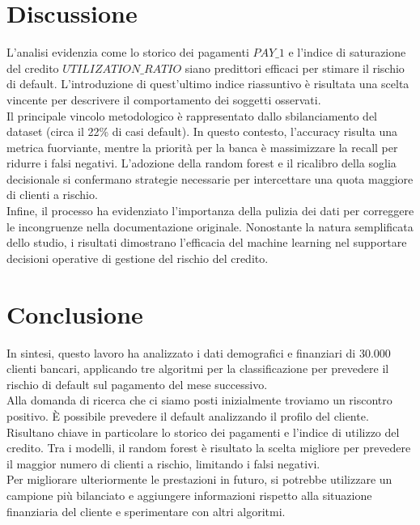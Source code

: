 \documentclass{article}
\begin{document}
\section{Discussione}
    L'analisi evidenzia come lo storico dei pagamenti $PAY\_1$ e l'indice di saturazione del credito $UTILIZATION\_RATIO$ siano predittori efficaci per stimare il rischio di default. L'introduzione di quest'ultimo indice riassuntivo \`e  risultata una scelta vincente per descrivere il comportamento dei soggetti osservati.\\
    Il principale vincolo metodologico \`e  rappresentato dallo sbilanciamento del dataset (circa il 22\% di casi default). In questo contesto, l'accuracy risulta una metrica fuorviante, mentre la priorit\`a per la banca \`e  massimizzare la recall per ridurre i falsi negativi. L'adozione della random forest e il ricalibro della soglia decisionale si confermano strategie necessarie per intercettare una quota maggiore di clienti a rischio.\\
    Infine, il processo ha evidenziato l'importanza della pulizia dei dati per correggere le incongruenze nella documentazione originale. Nonostante la natura semplificata dello studio, i risultati dimostrano l'efficacia del machine learning nel supportare decisioni operative di gestione del rischio del credito. 

\section{Conclusione}
    In sintesi, questo lavoro ha analizzato i dati demografici e finanziari di 30.000 clienti bancari, applicando tre algoritmi per la classificazione per prevedere il rischio di default sul pagamento del mese successivo.\\
    Alla domanda di ricerca che ci siamo posti inizialmente troviamo un riscontro positivo. \`E possibile prevedere il default analizzando il profilo del cliente. Risultano chiave in particolare lo storico dei pagamenti e l'indice di utilizzo del credito. Tra i modelli, il random forest \`e  risultato la scelta migliore per prevedere il maggior numero di clienti a rischio, limitando i falsi negativi.\\
    Per migliorare ulteriormente le prestazioni in futuro, si potrebbe utilizzare un campione pi\`u bilanciato e aggiungere informazioni rispetto alla situazione finanziaria del cliente e sperimentare con altri algoritmi.


\nocite{*}

\end{document}
